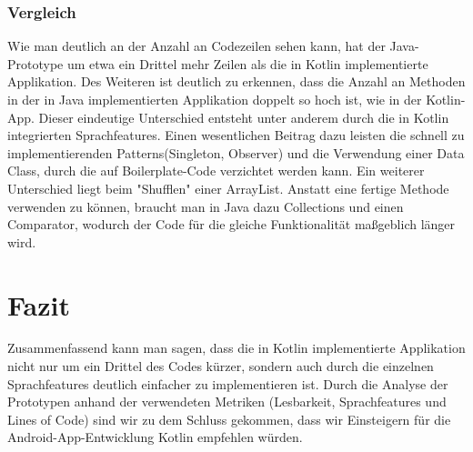 \documentclass{sigchi-ext}
\begin{document}
\subsubsection{Vergleich}
Wie man deutlich an der Anzahl an Codezeilen sehen kann, hat der Java-Prototype um etwa ein Drittel mehr Zeilen als die in Kotlin implementierte Applikation. Des Weiteren ist deutlich zu erkennen, dass die Anzahl an Methoden in der in Java implementierten Applikation doppelt so hoch ist, wie in der Kotlin-App.
Dieser eindeutige Unterschied entsteht unter anderem durch die in Kotlin integrierten Sprachfeatures. Einen wesentlichen Beitrag dazu leisten die schnell zu implementierenden Patterns(Singleton, Observer) und die Verwendung einer Data Class, durch die auf Boilerplate-Code verzichtet werden kann.
Ein weiterer Unterschied liegt beim "Shufflen" einer ArrayList. Anstatt eine fertige Methode verwenden zu können, braucht man in Java dazu Collections und einen Comparator, wodurch der Code für die gleiche Funktionalität maßgeblich länger wird.

\section{Fazit}
Zusammenfassend kann man sagen, dass die in Kotlin implementierte Applikation nicht nur um ein Drittel des Codes kürzer, sondern auch durch die einzelnen Sprachfeatures deutlich einfacher zu implementieren ist.
Durch die Analyse der Prototypen anhand der verwendeten Metriken (Lesbarkeit, Sprachfeatures und Lines of Code) sind wir zu dem Schluss gekommen, dass wir Einsteigern für die Android-App-Entwicklung Kotlin empfehlen würden.





\end{document}
